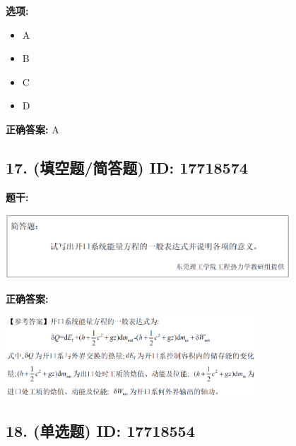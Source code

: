 \documentclass[12pt]{article}
\begin{document}
\textbf{选项:}
\begin{itemize}[leftmargin=*]
  \item A

  \item B

  \item C

  \item D

\end{itemize}

\textbf{正确答案:}
A

\vspace{0.5em}\hrulefill\vspace{1em}

\subsection*{17. (填空题/简答题) \small ID: 17718574}

\textbf{题干:}


\begin{center}\includegraphics[width=0.8\textwidth, height=0.25\textheight, keepaspectratio]{question_17_17718574/title_img_1.png}\end{center}

\textbf{正确答案:}

\begin{center}\includegraphics[width=0.7\textwidth, height=0.2\textheight, keepaspectratio]{question_17_17718574/correct_answer_1_img_1.png}\end{center}

\vspace{0.5em}\hrulefill\vspace{1em}

\subsection*{18. (单选题) \small ID: 17718554}
\end{document}
